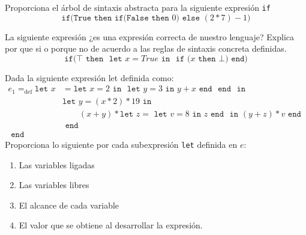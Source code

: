     \bigskip
    
    \begin{exercise}
        Proporciona el árbol de sintaxis abstracta para la siguiente expresión \texttt{if}
        \[
            \texttt{if(} \texttt{True} \texttt{ then } \texttt{if(}  \texttt{False} \texttt{ then } 0) \texttt{ else } (2 * 7) - 1 \texttt{)}
        \]
    \end{exercise}

    \bigskip
    
    \begin{exercise}
        La siguiente expresión ¿es una expresión correcta de nuestro lenguaje? Explica por que si o porque no de acuerdo a las reglas de sintaxis concreta definidas.
        \[
            \texttt{if(} \top \texttt{ then } \texttt{ let } x = True \texttt{ in } \texttt{ if (} x \texttt{ then } \bot \texttt{)} \texttt{ end} \text{)}
        \]
    \end{exercise}

    \bigskip
    
    \begin{exercise}
        Dada la siguiente expresión let definida como:
        \begin{align*}
        	e_1=_{\text{def}}\texttt{let  }
        		x&= \texttt{let }x = 2 \texttt{ in } \texttt{ let } y = 3 \texttt{ in } y + x \texttt{ end } \texttt{ end }
        		\texttt{ in }\\
        		 &\texttt{let }y=(x \ast 2) \ast 19 
        		 	\texttt{ in } \\
        		 & \qquad(x + y) \ast \texttt{let } z = \texttt{ let } v = 8 \texttt{ in } z \texttt{ end } \texttt{ in } 
        		 						(y + z) \ast v 
        		 				\texttt{ end }\\
        		 &\texttt{ end }\\
        	\texttt{ end }&
        \end{align*}
        Proporciona lo siguiente por cada subexpresión \texttt{let} definida en $e$:\\
        \begin{enumerate}
            \item Las variables ligadas
            \item Las variables libres
            \item El alcance de cada variable
            \item El valor que se obtiene al desarrollar la expresión.
        \end{enumerate}
    \end{exercise}

